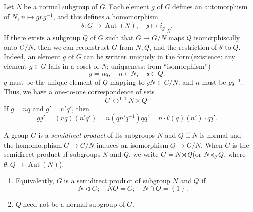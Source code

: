 Let \( N \) be a normal subgroup of \( G \).
Each element \( g \) of \( G \) defines an automorphism of \( N \), \( n \mapsto g n g^{-1} \), and this defines a homomorphism
\[
  \theta: G \to \operatorname{Aut}(N),\quad g \mapsto \left. i_g \right\vert_N.
\]
If there exists a subgroup \( Q \) of \( G \) such that \( G \to G / N \) maps \( Q \) isomorphiscally onto \( G / N \), then we can reconstruct \( G \) from \( N, Q \), and the restriction of \( \theta \) to \( Q \).
Indeed, an element \( g \) of \( G \) can be written uniquely in the form(existence: any element \( g \in G \) falls in a coset of \( N \); uniqueness: from ``isomorphism'')
\[
  g = nq,\quad n \in N,\quad q \in Q.
\]
\( q \) must be the unique element of \( Q \) mapping to \( gN \in G / N \), and \( n \) must be \( gq^{-1} \).
Thus, we have a one-to-one correspondence of sets
\[
  G \mathop{\longleftrightarrow}^{1:1} N \times Q.
\]
If \( g = nq \) and \( g' = n'q' \), then
\[
  gg' = (nq)(n'q') = n(qn'q^{-1})qq' = n \cdot \theta(q)(n') \cdot qq'.
\]
\begin{definition}
  A group \( G \) is a \emph{semidirect product} of its subgroups \( N \) and \( Q \) if \( N \) is normal and the homomorphism \( G \to G / N \) induces an isomorphism \( Q \to G / N \).
  When \( G \) is the semidirect product of subgroups \( N \) and \( Q \), we write \( G = N \rtimes Q \)(or \( N \rtimes_\theta Q \), where \( \theta: Q \to \operatorname{Aut}(N) \)).
\end{definition}
\begin{remark}
  \begin{enumerate}
    \item Equivalently, \( G \) is a semidirect product of subgroup \( N \) and \( Q \) if
      \[
        N \triangleleft G;\quad NQ = G;\quad N \cap Q = \left\lbrace 1 \right\rbrace.
      \]
    \item \( Q \) need not be a normal subgroup of \( G \).
  \end{enumerate}
\end{remark}

